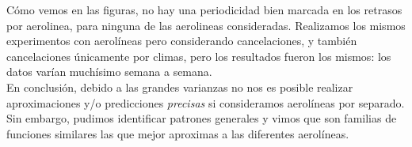 



Cómo vemos en las figuras, no hay una periodicidad bien marcada en los retrasos por aerolinea, para ninguna de las aerolineas consideradas. Realizamos los mismos experimentos con aerolíneas pero considerando cancelaciones, y también cancelaciones únicamente por climas, pero los resultados fueron los mismos: los datos varían muchísimo semana a semana. \\

En conclusión, debido a las grandes varianzas no nos es posible realizar aproximaciones y/o predicciones \textit{precisas} si consideramos aerolíneas por separado. Sin embargo, pudimos identificar patrones generales y vimos que son familias de funciones similares las que mejor aproximas a las diferentes aerolíneas. \\

